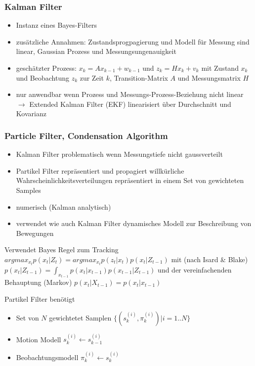 \documentclass[paper=a4, fontsize=11pt]{scrartcl} %
\numberwithin{equation}{section} %
\numberwithin{figure}{section} %
\numberwithin{table}{section} %
\begin{document}
\subsubsection{Kalman Filter}

\begin{itemize}
\item Instanz eines Bayes-Filters
\item zusätzliche Annahmen: Zustandsprogpagierung und Modell für Messung sind linear, Gaussian Prozess und Messungsungenauigkeit
\item geschätzter Prozess: $x_k = A x_{k-1} + w_{k-1}$ und $z_k = H x_k + v_k$ mit Zustand $x_k$ und Beobachtung $z_k$ zur Zeit $k$, Transition-Matrix $A$ und Messungsmatrix $H$
\item nur anwendbar wenn Prozess und Messungs-Prozess-Beziehung nicht linear $\rightarrow$ Extended Kalman Filter (EKF) linearisiert über Durchschnitt und Kovarianz
\end{itemize}

\subsubsection{Particle Filter, Condensation Algorithm}

\begin{itemize}
\item Kalman Filter problematisch wenn Messungstiefe nicht gaussverteilt
\item Partikel Filter repräsentiert und propagiert willkürliche Wahrscheinlichkeitsverteilungen repräsentiert in einem Set von gewichteten Samples
\item numerisch (Kalman analytisch)
\item verwendet wie auch Kalman Filter dynamisches Modell zur Beschreibung von Bewegungen
\end{itemize}

Verwendet Bayes Regel zum Tracking $argmax_{x_t} p(x_t|Z_t) = argmax_{x_t} p(z_t|x_t) p(x_t|Z_{t-1})$ mit (nach Isard \& Blake) $p(x_t|Z_{t-1}) = \int_{x_{t-1}} p(x_t|x_{t-1}) p(x_{t-1}|Z_{t-1})$ und der vereinfachenden Behauptung (Markov) $p(x_t|X_{t-1}) = p(x_t|x_{t-1})$

Partikel Filter benötigt
\begin{itemize}
\item Set von $N$ gewichtetet Samplen $\{(s_k^{(i)}, \pi_k^{(i)})|i=1..N\}$
\item Motion Modell $s_k^{(i)} \leftarrow s_{k-1}^{(i)}$
\item Beobachtungsmodell $\pi_k^{(i)} \leftarrow s_k^{(i)}$
\end{itemize}
\end{document}
